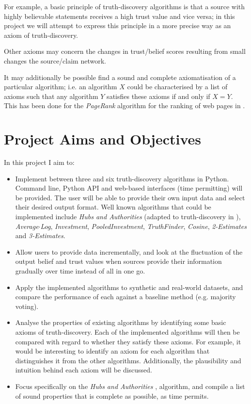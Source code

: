 \documentclass{article}
\begin{document}
For example, a basic principle of truth-discovery algorithms is that a source
with highly believable statements receives a high trust value and vice versa;
in this project we will attempt to express this principle in a more precise way
as an axiom of truth-discovery.

Other axioms may concern the changes in trust/belief scores resulting from
small changes the source/claim network.

It may additionally be possible find a sound and complete axiomatisation of a
particular algorithm; i.e. an algorithm $X$ could be characterised by a list of
axioms such that any algorithm $Y$ satisfies these axioms if and only if $X=Y$.
This has been done for the \emph{PageRank} algorithm for the ranking of web
pages in \cite{altman}.

\section{Project Aims and Objectives}
\label{sec:aims}

In this project I aim to:

\begin{itemize}

\item Implement between three and six truth-discovery algorithms in Python.
Command line, Python API and web-based interfaces (time permitting) will be
provided. The user will be able to provide their own input data and select
their desired output format. Well known algorithms that could be implemented
include \emph{Hubs and Authorities} \cite{kleinberg} (adapted to
truth-discovery in \cite{pasternack}), \emph{Average$\cdot$Log},
\emph{Investment}, \emph{PooledInvestment}{\cite{pasternack}},
\emph{TruthFinder}{\cite{yin_han_yu}}, \emph{Cosine}, \emph{2-Estimates} and
\emph{3-Estimates}{\cite{galland}}.

\item Allow users to provide data incrementally, and look at the fluctuation of
the output belief and trust values when sources provide their information
gradually over time instead of all in one go.

\item Apply the implemented algorithms to synthetic and real-world datasets,
and compare the performance of each against a baseline method (e.g. majority
voting).

\item Analyse the properties of existing algorithms by identifying some basic
axioms of truth-discovery. Each of the implemented algorithms will then be
compared with regard to whether they satisfy these axioms. For example, it
would be interesting to identify an axiom for each algorithm that distinguishes
it from the other algorithms. Additionally, the plausibility and intuition
behind each axiom will be discussed.

\item Focus specifically on the \emph{Hubs and Authorities} \cite{kleinberg,
pasternack}, algorithm, and compile a list of sound properties that is complete
as possible, as time permits.

\end{itemize}
\end{document}
